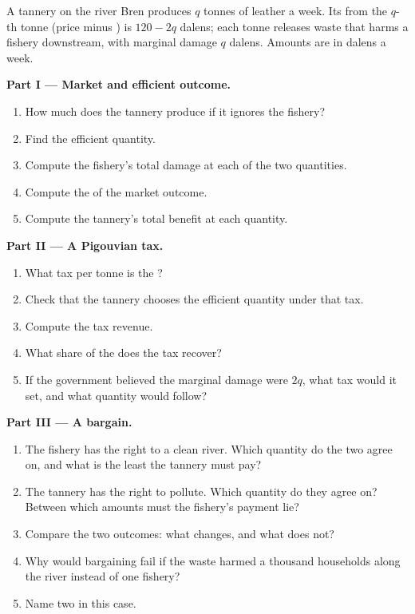 \begin{problem}
\label{pb:g11:externalities:1}
A tannery on the river Bren produces $q$ tonnes of leather a week. Its  from the $q$-th tonne (price minus ) is $120 - 2q$ dalens; each
tonne releases waste that harms a fishery downstream, with marginal damage $q$ dalens. Amounts are in dalens a week.

\medskip
\noindent\textbf{Part I --- Market and efficient outcome.}
\begin{enumerate}
\item How much does the tannery produce if it ignores the fishery?
\item Find the efficient quantity.
\item Compute the fishery's total damage at each of the two quantities.
\item Compute the  of the market outcome.
\item Compute the tannery's total benefit at each quantity.
\end{enumerate}

\medskip
\noindent\textbf{Part II --- A Pigouvian tax.}
\begin{enumerate}[resume]
\item What tax per tonne is the ?
\item Check that the tannery chooses the efficient quantity under that tax.
\item Compute the tax revenue.
\item What share of the  does the tax recover?
\item If the government believed the marginal damage were $2q$, what tax would it set, and what quantity would follow?
\end{enumerate}

\medskip
\noindent\textbf{Part III --- A bargain.}
\begin{enumerate}[resume]
\item The fishery has the right to a clean river. Which quantity do the two agree on, and what is the least the tannery must pay?
\item The tannery has the right to pollute. Which quantity do they agree on? Between which amounts must the fishery's payment lie?
\item Compare the two outcomes: what changes, and what does not?
\item Why would bargaining fail if the waste harmed a thousand households along the river instead of one fishery?
\item Name two  in this case.
\end{enumerate}


\end{problem}
